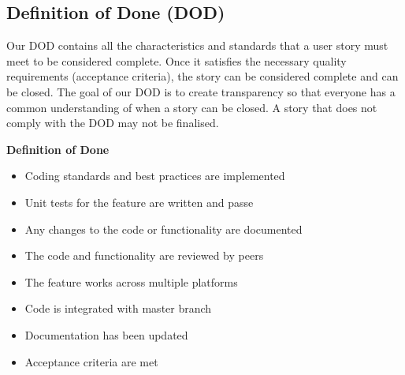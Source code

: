 \subsection{Definition of Done (DOD)}
Our DOD contains all the characteristics and standards that a user story must meet to be considered complete.
Once it satisfies the necessary quality requirements (acceptance criteria), the story can be considered complete and can be closed.
The goal of our DOD is to create transparency so that everyone has a common understanding of when a story can be closed.
A story that does not comply with the DOD may not be finalised.

\textbf{Definition of Done}
\begin{itemize}
    \item Coding standards and best practices are implemented
    \item Unit tests for the feature are written and passe
    \item Any changes to the code or functionality are documented
    \item The code and functionality are reviewed by peers
    \item The feature works across multiple platforms
    \item Code is integrated with master branch
    \item Documentation has been updated
    \item Acceptance criteria are met
\end{itemize}
\clearpage

